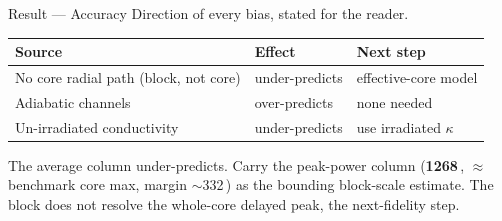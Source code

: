 \documentclass[aspectratio=169, 11pt, t]{beamer}
\newcommand{\hot}[1]{\textcolor{RadHot}{\textbf{#1}}}
\begin{document}
\begin{frame}{Result --- Accuracy}
{\color{midGray}\footnotesize Direction of every bias, stated for the reader.}
\vspace{7pt}

{\small\renewcommand{\arraystretch}{1.12}
\begin{tabular}{@{}p{6.2cm} p{2.8cm} p{3.4cm}@{}}
\toprule
\textbf{Source} & \textbf{Effect} & \textbf{Next step}\\
\midrule
No core radial path (block, not core) & under-predicts & effective-core model\\
Adiabatic channels & over-predicts & none needed\\
Un-irradiated conductivity & under-predicts & use irradiated $\kappa$\\
\bottomrule
\end{tabular}}
\vspace{4pt}

\begin{tcolorbox}[hotbox]
\small The average column under-predicts. Carry the peak-power column (\hot{1268\,\textcelsius}, $\approx$ benchmark core max, margin $\sim$332\,\textcelsius) as the bounding block-scale estimate. The block does not resolve the whole-core delayed peak, the next-fidelity step.
\end{tcolorbox}
\end{frame}
\end{document}
